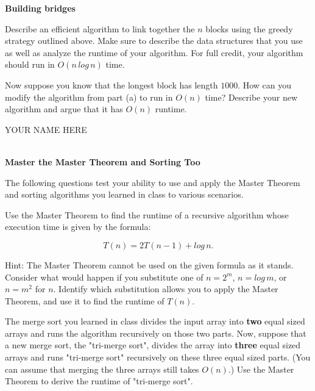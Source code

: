 \documentclass[12pt,twoside]{article}
\def\MLine#1{\par\hspace*{-\leftmargin}\parbox{\textwidth}{\[#1\]}}
\newcommand{\yourname}{YOUR NAME HERE}  %
\begin{document}
\begin{problems}

\problem {} \textbf{Building bridges}

\begin{problemparts}
\problempart {}
Describe an efficient algorithm to link together the $n$ blocks using the greedy strategy outlined above. Make sure to describe the data structures that you use as well as analyze the runtime of your algorithm. For full credit, your algorithm should run in $O(n\,log\,n)$ time.


\problempart {}
Now suppose you know that the longest block has length $1000$. How can you modify the algorithm from part (a) to run in $O(n)$ time? Describe your new algorithm and argue that it has $O(n)$ runtime.

\end{problemparts}
\newpage
\begin{large} \yourname \end{large} \\

\problem {} \textbf{Master the Master Theorem and Sorting Too}

The following questions test your ability to use and apply the Master Theorem and sorting algorithms you learned in class to various scenarios.

\begin{problemparts}
\problempart {} Use the Master Theorem to find the runtime of a recursive algorithm whose execution time is given by the formula:

\MLine{T(n) = 2T(n-1) + log\,n.}

Hint: The Master Theorem cannot be used on the given formula as it stands. Consider what would happen if you substitute one of $n = 2^m$, $n = log\,m$, or $n=m^2$ for $n$. Identify which substitution allows you to apply the Master Theorem, and use it to find the runtime of $T(n)$.


\problempart {}
The merge sort you learned in class divides the input array into \textbf{two} equal sized arrays and runs the algorithm recursively on those two parts. Now, suppose that a new merge sort, the "tri-merge sort", divides the array into \textbf{three} equal sized arrays and runs "tri-merge sort" recursively on these three equal sized parts. (You can assume that merging the three arrays still takes $O(n)$.) Use the Master Theorem to derive the runtime of "tri-merge sort".


\end{problemparts}
\end{problems}
\end{document}
